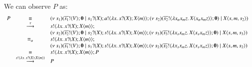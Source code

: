 \noi We can observe $P$ as:
\[
	\begin{array}{rcl}
		P &\equiv&
		(\nu\ s_1)(\overline{s_1} ! \langle V \rangle ; \mathbf{0} \;|\; s_1 ? (X) ; a ! \langle \lambda x.\,x ? (X) ; X\langle m \rangle \rangle ; (\nu\ s_2)(\overline{s_2} ! \langle \lambda x_a x_m z.\,X\langle x_a x_m z \rangle \rangle ; \mathbf{0}) \;|\; X\langle s,m, s_2 \rangle)
		\\
		&\stackrel{\tau}{\longrightarrow}&
		s ! \langle \lambda x.\,x ? (X) ; X\langle m \rangle \rangle ;\\
		&& (\nu\ s_2)(\overline{s_2} ! \langle V \rangle ; \mathbf{0} \;|\; s_2 ? (X) ; s ! \langle \lambda x.\,x ? (X) ; X\langle m \rangle \rangle ; (\nu\ s_3)(\overline{s_3} ! \langle \lambda x_s x_m z.\,X\langle x_s x_m z \rangle \rangle ; \mathbf{0}) \;|\; X\langle s,m, s_3 \rangle)
		\\
		&\equiv_{\alpha}&
		s ! \langle \lambda x.\,x ? (X) ; X\langle m \rangle \rangle ;\\
		& & (\nu\ s_1)(\overline{s_1} ! \langle V \rangle ; \mathbf{0} \;|\; s_1 ? (X) ; s ! \langle \lambda x.\,x ? (X) ; X\langle m \rangle \rangle ; (\nu\ s_2)(\overline{s_2} ! \langle \lambda x_s x_m z.\,X\langle x_s x_m z \rangle \rangle ; \mathbf{0}) \;|\; X\langle s,m, s_2 \rangle)\\
		&\equiv& s ! \langle \lambda x.\,x ? (X) ; X\langle m \rangle \rangle ; P
		\\
		&\stackrel{s ! \langle \lambda x.\,x ? (X) ; X\langle m \rangle \rangle}{\longrightarrow}& P
	\end{array}
\]


